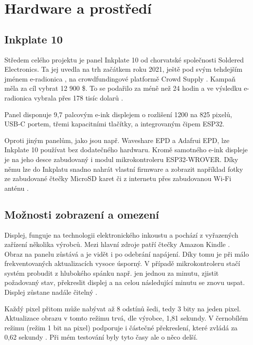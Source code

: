 \chapter{Hardware a prostředí}

\section{Inkplate 10}
Středem celého projektu je panel Inkplate 10 od chorvatské společnosti Soldered Electronics. Ta jej uvedla na trh začátkem roku 2021, ještě pod svým tehdejším jménem e-radionica \cite{solderedelectronicsUs}, na crowdfundingové platformě Crowd Supply \cite{zovkoOurCampaignLive2021}.
Kampaň měla za cíl vybrat 12 900 \$. To se podařilo za méně než 24 hodin \cite{crowdsupplyna[@crowd_supply]NewCampaignLaunched2021} a ve výsledku e-radionica vybrala přes 178 tisíc dolarů \cite{solderedelectronicsInkplate102021}.

Panel disponuje 9,7 palcovým e-ink displejem o rozlišení 1200 na 825 pixelů, USB-C portem, třemi kapacitními tlačítky, a integrovaným čipem ESP32.

Oproti jiným panelům, jako jsou např. Waveshare EPD a Adafrui EPD, lze Inkplate 10 používat bez dodatečného hardwaru. Kromě samotného e-ink displeje je na jeho desce zabudovaný i modul mikrokontroleru ESP32-WROVER. Díky němu lze do Inkplatu snadno nahrát vlastní firmware a zobrazit například fotky ze zabudované čtečky MicroSD karet či z internetu přes zabudovanou Wi-Fi anténu \cite{solderedelectronicsInkplate102021}.

\section{Možnosti zobrazení a omezení}

Displej, funguje na technologii elektronického inkoustu a pochází z vyřazených zařízení několika výrobců. Mezi hlavní zdroje patří čtečky Amazon Kindle \cite{solderedelectronicsInkplate102021}. Obraz na panelu zůstává a je vidět i po odebrání napájení. Díky tomu je při málo frekventovaných aktualizacích vysoce úsporný. V případě mikrokontroleru stačí systém probudit z hlubokého spánku např. jen jednou za minutu, zjistit požadovaný stav, překreslit displej a na celou následující minutu se znovu uspat. Displej zůstane nadále čitelný \cite{heikenfeldReviewPaperCritical2011}.

Každý pixel přitom může nabývat až 8 odstínů šedi, tedy 3 bity na jeden pixel. Aktualizace obrazu v tomto režimu trvá, dle výrobce, 1,81 sekundy.
V černobílém režimu (režim 1 bit na pixel) podporuje i částečné překreslení, které zvládá za 0,62 sekundy \cite{solderedelectronicsInkplate102021}. Při mém testování byly tyto časy ale o něco delší.

